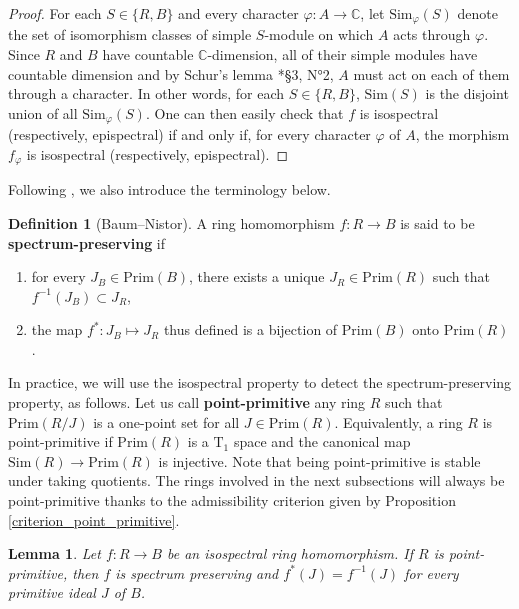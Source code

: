 \documentclass{amsart}
\newtheorem{lemma}[theorem]{Lemma}
\theoremstyle{definition}
\newtheorem{definition}[theorem]{Definition}
\begin{document}
\begin{proof}
    For each $S \in \{R,B\}$ and every character $\varphi : A \to \mathbb{C}$, let  $\mathrm{Sim}_\varphi(S)$ denote the set of isomorphism classes of simple $S$-module on which $A$ acts through $\varphi$.
    Since $R$ and $B$ have countable $\mathbb{C}$-dimension, all of their simple modules have countable dimension and by Schur's lemma \cite{Bourbaki}*{§3, N°2}, $A$ must act on each of them through a character. In other words, for each $S \in \{R,B\}$, $\mathrm{Sim}(S)$ is the disjoint union of all $\mathrm{Sim}_\varphi(S)$. One can then easily check that $f$ is isospectral (respectively, epispectral) if and only if, for every character $\varphi$ of $A$, the morphism $f_\varphi$ is isospectral (respectively, epispectral).
\end{proof}

Following \cite{BaumNistor}, we also introduce the terminology below.

\begin{definition}[Baum--Nistor]\label{definition_spectrum_preserving}
    A ring homomorphism $f : R \to B$ is said to be \textbf{spectrum-preserving} if
    \begin{enumerate}
        \item for every $J_B \in \mathrm{Prim}(B)$, there exists a unique $J_R \in \mathrm{Prim}(R)$ such that $f^{-1}(J_B) \subset J_R $,
        \item the map $f^* : J_B \mapsto J_R$ thus defined is a bijection of $\mathrm{Prim}(B)$ onto $\mathrm{Prim}(R)$.
    \end{enumerate}
\end{definition}

In practice, we will use the isospectral property to detect the spectrum-preserving property, as follows. Let us call \textbf{point-primitive} any ring $R$ such that $\mathrm{Prim}(R/J)$ is a one-point set for all $J \in \mathrm{Prim}(R)$. Equivalently, a ring $R$ is point-primitive if $\mathrm{Prim}(R)$ is a $\mathrm{T_1}$ space and the canonical map $\mathrm{Sim}(R) \to \mathrm{Prim}(R)$ is injective. Note that being point-primitive is stable under taking quotients. The rings involved in the next subsections will always be point-primitive thanks to the admissibility criterion given by Proposition \ref{criterion_point_primitive}.

\begin{lemma}\label{isospectral_implies_spectrum_preserving}
    Let $f : R \to B$ be an isospectral ring homomorphism. If $R$ is point-primitive, then $f$ is spectrum preserving and $f^*(J) = f^{-1}(J)$ for every primitive ideal $J$ of $B$.
\end{lemma}
\end{document}
